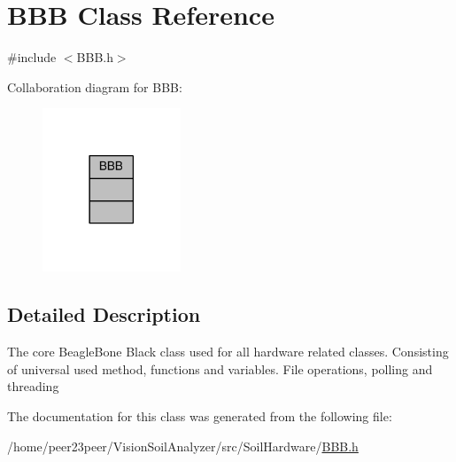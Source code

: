\hypertarget{class_b_b_b}{}\section{B\+B\+B Class Reference}
\label{class_b_b_b}


{\ttfamily \#include $<$B\+B\+B.\+h$>$}



Collaboration diagram for B\+B\+B\+:\nopagebreak
\begin{figure}[H]
\begin{center}
\leavevmode
\includegraphics[width=117pt]{class_b_b_b__coll__graph}
\end{center}
\end{figure}


\subsection{Detailed Description}
The core Beagle\+Bone Black class used for all hardware related classes. Consisting of universal used method, functions and variables. File operations, polling and threading 

The documentation for this class was generated from the following file\+:\begin{DoxyCompactItemize}
\item 
/home/peer23peer/\+Vision\+Soil\+Analyzer/src/\+Soil\+Hardware/\hyperlink{_b_b_b_8h}{B\+B\+B.\+h}\end{DoxyCompactItemize}
